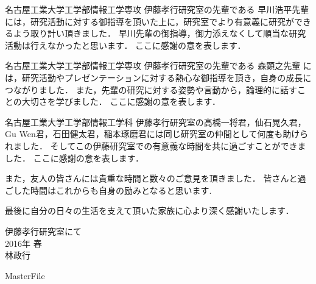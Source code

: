名古屋工業大学工学部情報工学専攻 伊藤孝行研究室の先輩である 早川浩平先輩 には，研究活動に対する御指導を頂いた上に，研究室でより有意義に研究ができるよう取り計い頂きました．
早川先輩の御指導，御力添えなくして順当な研究活動は行えなかったと思います．
ここに感謝の意を表します． \par
\vspace{0.5cm}

名古屋工業大学工学部情報工学専攻 伊藤孝行研究室の先輩である 森顕之先輩 には，研究活動やプレゼンテーションに対する熱心な御指導を頂き，自身の成長につながりました．
また，先輩の研究に対する姿勢や言動から，論理的に話すことの大切さを学びました．
ここに感謝の意を表します． \par
\vspace{0.5cm}

名古屋工業大学工学部情報工学科 伊藤孝行研究室の高橋一将君，仙石晃久君，Gu Wen君，石田健太君，稲本琢磨君には同じ研究室の仲間として何度も助けられました．
そしてこの伊藤研究室での有意義な時間を共に過ごすことができました．
ここに感謝の意を表します． \par
\vspace{0.5cm}

また，友人の皆さんには貴重な時間と数々のご意見を頂きました．
皆さんと過ごした時間はこれからも自身の励みとなると思います.\par
\vspace{0.5cm}

最後に自分の日々の生活を支えて頂いた家族に心より深く感謝いたします．

\begin{flushright}
伊藤孝行研究室にて\\
2016年 春\\
林政行
\end{flushright}
\expandafter\ifx\csname MasterFile\endcsname\relax

\fi
